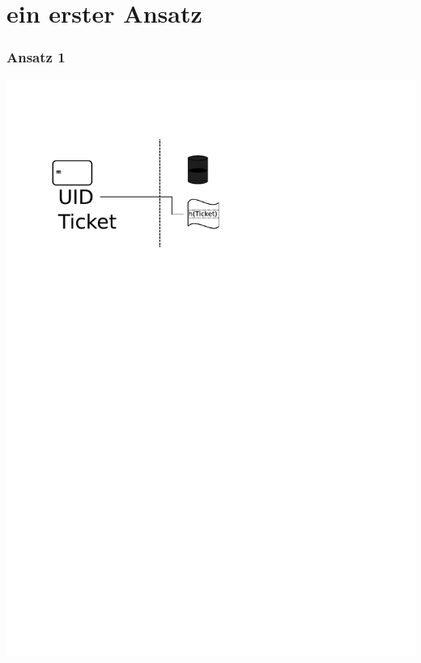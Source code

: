 \section{ein erster Ansatz}
\begin{frame}
	\frametitle{Ansatz 1}
\includegraphics[scale=0.75]{ansatz1.pdf}
\end{frame}

